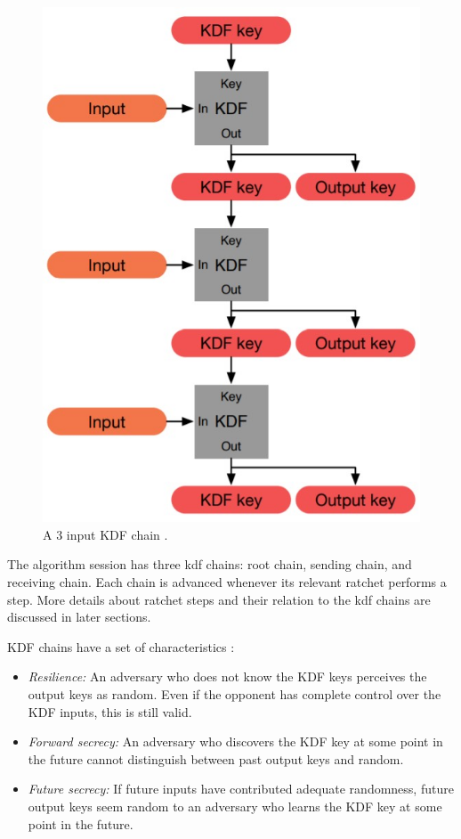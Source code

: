 \begin{figure}[hptb]
	\centering
	\includegraphics[scale=0.4]{Images/kdf-chain.jpg}
	\caption{A 3 input KDF chain \cite{dblRtcht}.}
	\label{fig:kdf-chain}
\end{figure}

The algorithm session has three \gls{kdf} chains: root chain, sending chain, and receiving chain. Each chain is advanced whenever its relevant ratchet performs a step. More details about ratchet steps and their relation to the \gls{kdf} chains are discussed in later sections.
\par
KDF chains have a set of characteristics \cite{dblRtcht}:
\begin{itemize}
	\item \textit{Resilience:} An adversary who does not know the KDF keys perceives the output keys as random. Even if the opponent has complete control over the KDF inputs, this is still valid.
	
	\item \textit{Forward secrecy:} An adversary who discovers the KDF key at some point in the future cannot distinguish between past output keys and random.
	
	\item \textit{Future secrecy:} If future inputs have contributed adequate randomness, future output keys seem random to an adversary who learns the KDF key at some point in the future.
\end{itemize}

